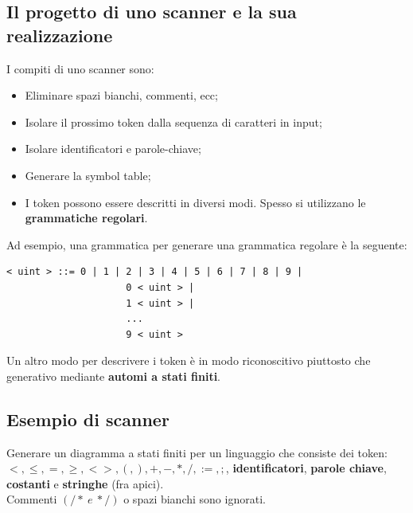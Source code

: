 \documentclass[12pt]{report}
\begin{document}
	\subsection{Il progetto di uno scanner e la sua realizzazione}
	I compiti di uno scanner sono:
	\begin{itemize}
		\item Eliminare spazi bianchi, commenti, ecc;
		\item Isolare il prossimo token dalla sequenza di caratteri in input;
		\item Isolare identificatori e parole-chiave;
		\item Generare la symbol table;
		\item I token possono essere descritti in diversi modi. Spesso si utilizzano le \textbf{grammatiche regolari}.
	\end{itemize}
	Ad esempio, una grammatica per generare una grammatica regolare è la seguente:
	\begin{lstlisting}[style=pascalstyle]
		< uint > ::= 0 | 1 | 2 | 3 | 4 | 5 | 6 | 7 | 8 | 9 |
					 0 < uint > |
					 1 < uint > |
					 ...
					 9 < uint >
	\end{lstlisting}
	Un altro modo per descrivere i token è in modo riconoscitivo piuttosto che generativo mediante \textbf{automi a stati finiti}.\\
	\subsection{Esempio di scanner}
	Generare un diagramma a stati finiti per un linguaggio che consiste dei token: $<, \leq, =, \geq, <>, (, ), +, -, *, /, :=, ;$, \textbf{identificatori}, \textbf{parole chiave}, \textbf{costanti} e \textbf{stringhe} (fra apici). \\
	Commenti $(/* \ e\ * /)$ o spazi bianchi sono ignorati. \\
\end{document}
